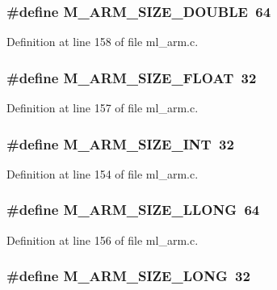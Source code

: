 \subsubsection{\setlength{\rightskip}{0pt plus 5cm}\#define M\_\-ARM\_\-SIZE\_\-DOUBLE~64}\label{ml__arm_8c_28f72e3ba146b889bf639c4197dd6f86}




Definition at line 158 of file ml\_\-arm.c.
\subsubsection{\setlength{\rightskip}{0pt plus 5cm}\#define M\_\-ARM\_\-SIZE\_\-FLOAT~32}\label{ml__arm_8c_8315f0d2c5f95743dd63e362566c4cea}




Definition at line 157 of file ml\_\-arm.c.
\subsubsection{\setlength{\rightskip}{0pt plus 5cm}\#define M\_\-ARM\_\-SIZE\_\-INT~32}\label{ml__arm_8c_5e93cafac4413f16a5c855f0f265e83e}




Definition at line 154 of file ml\_\-arm.c.
\subsubsection{\setlength{\rightskip}{0pt plus 5cm}\#define M\_\-ARM\_\-SIZE\_\-LLONG~64}\label{ml__arm_8c_9d5adf297f89b68a90e131f96264f09d}




Definition at line 156 of file ml\_\-arm.c.
\subsubsection{\setlength{\rightskip}{0pt plus 5cm}\#define M\_\-ARM\_\-SIZE\_\-LONG~32}\label{ml__arm_8c_69b5207b10b60b821721b4d1c5eb05d9}




